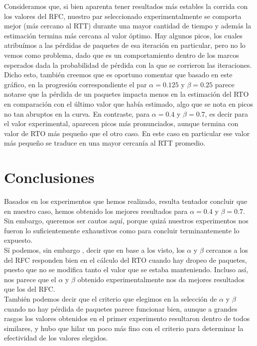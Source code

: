 \indent Consideramos que, si bien aparenta tener resultados más estables la corrida con los valores del RFC, nuestro par seleccionado experimentalmente se comporta mejor (más cercano al RTT) durante una mayor cantidad de tiempo y además la estimación termina más cercana al valor óptimo. Hay algunos picos, los cuales atribuímos a las pérdidas de paquetes de esa iteración en particular, pero no lo vemos como problema, dado que es un comportamiento dentro de los marcos esperados dada la probabilidad de pérdida con la que se corrieron las iteraciones. Dicho esto, también creemos que es oportuno comentar que basado en este gráfico, en la progresión correspondiente el par $\alpha = 0.125$ y $\beta=0.25$ parece notarse que la pérdida de un paquetes impacta menos en la estimación del RTO en comparación con el último valor que había estimado, algo que se nota en picos no tan abruptos en la curva. En contraste, para $\alpha = 0.4$ y $\beta = 0.7$, es decir para el valor experimental, aparecen picos más pronunciados, aunque termina con valor de RTO más pequeño que el otro caso. En este caso en particular ese valor más pequeño se traduce en una mayor cercanía al RTT promedio.\\


\section{Conclusiones}


\indent \indent Basados en los experimentos que hemos realizado, resulta tentador concluir que en nuestro caso, hemos obtenido los mejores resultados para $\alpha = 0.4$ y $\beta = 0.7$. Sin embargo, queremos ser cautos aquí, porque quizá nuestros experimentos nos fueron lo suficientemente exhaustivos como para concluir terminantemente lo expuesto.\\
\indent Sí podemos, sin embargo , decir que en base a los visto, los $\alpha$ y $\beta$ cercanos a los del RFC responden bien en el cálculo del RTO cuando hay dropeo de paquetes, puesto que no se modifica tanto el valor que se estaba manteniendo. Incluso así, nos parece que el $\alpha$ y $\beta$ obtenido experimentalmente nos da mejores resultados que los del RFC.\\
\indent También podemos decir que el criterio que elegimos en la selección de $\alpha$ y $\beta$ cuando no hay pérdida de paquetes parece funcionar bien, aunque a grandes rasgos los valores obtenidos en el primer experimento resultaron dentro de todos similares, y hubo que hilar un poco más fino con el criterio para determinar la efectividad de los valores elegidos.\\
